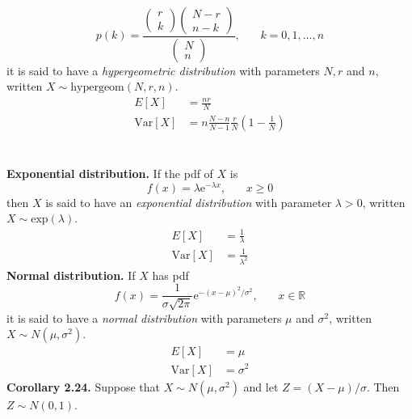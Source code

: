 \documentclass[12pt,a4paper]{report}
\begin{document}
\begin{equation}
p(k)=\frac{\begin{pmatrix}r\\k\end{pmatrix}\begin{pmatrix}N-r\\n-k\end{pmatrix}}{\begin{pmatrix}N\\n\end{pmatrix}},\phantom{mm}k=0,1,\ldots,n
\end{equation}
it is said to have a \textit{hypergeometric distribution} with parameters $N,r$ and $n$, written $X\sim\text{hypergeom}(N,r,n)$.
\begin{align*}
E[X]&=\frac{nr}{N}\\
\text{Var}[X]&=n\frac{N-n}{N-1}\frac{r}{N}\left(1-\frac{1}{N}\right)
\end{align*}
\clearpage
{}\\\\
\textbf{Exponential distribution.} If the pdf of $X$ is
\begin{equation}
f(x)=\lambda\mathrm{e}^{-\lambda x},\phantom{mm}x\geq0
\end{equation}
then $X$ is said to have an \textit{exponential distribution} with parameter $\lambda>0$, written $X\sim\text{exp}(\lambda)$.
\begin{align*}
E[X]&=\frac{1}{\lambda}\\
\text{Var}[X]&=\frac{1}{\lambda^2}
\end{align*}
\textbf{Normal distribution.} If $X$ has pdf
\begin{equation}
f(x)=\frac{1}{\sigma\sqrt{2\pi}}\mathrm{e}^{-(x-\mu)^2/\sigma^2},\phantom{mm}x\in\mathbb{R}
\end{equation}
it is said to have a \textit{normal distribution} with parameters $\mu$ and $\sigma^2$, written $X\sim N(\mu,\sigma^2)$.
\begin{align*}
E[X]&=\mu\\
\text{Var}[X]&=\sigma^2
\end{align*}
\textbf{Corollary 2.24.} Suppose that $X\sim N(\mu,\sigma^2)$ and let $Z=(X-\mu)/\sigma$. Then $Z\sim N(0,1)$.
\end{document}

